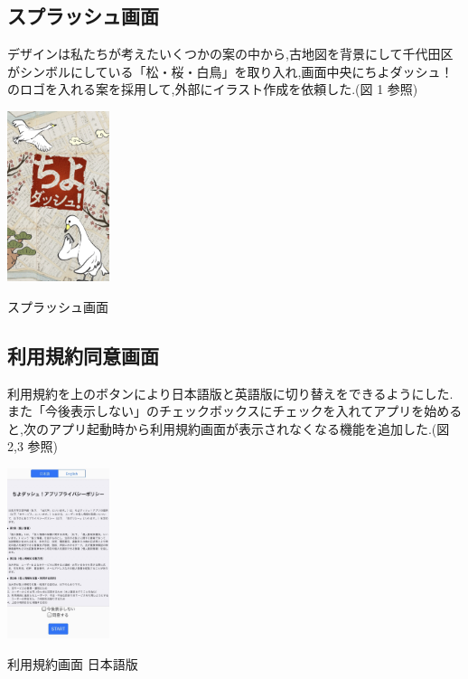 \documentclass[a4paper, twoside]{jarticle}
\makeatletter
\newenvironment{figurehere}
  {\def\@captype{figure}}
  {}
\makeatother
\begin{document}
\begin{multicols}{2}
\subsection{スプラッシュ画面}
デザインは私たちが考えたいくつかの案の中から,古地図を背景にして千代田区がシンボルにしている「松・桜・白鳥」を取り入れ,画面中央にちよダッシュ！のロゴを入れる案を採用して,外部にイラスト作成を依頼した.(図 1 参照)

\begin{figurehere}
\begin{center}
\includegraphics[bb=30 50 550 1300,width=3cm]{./image01.jpg}%
\end{center}
\caption{スプラッシュ画面}\label{fig:1}
\end{figurehere}

\subsection{利用規約同意画面}
利用規約を上のボタンにより日本語版と英語版に切り替えをできるようにした.
また「今後表示しない」のチェックボックスにチェックを入れてアプリを始めると,次のアプリ起動時から利用規約画面が表示されなくなる機能を追加した.(図 2,3 参照)
\begin{figurehere}
\begin{center}
\includegraphics[bb=30 50 550 1300,width=3cm]{./image02.jpg}%
\end{center}
\caption{利用規約画面 日本語版}\label{fig:2}


\end{figurehere}
\end{multicols}
\end{document}
